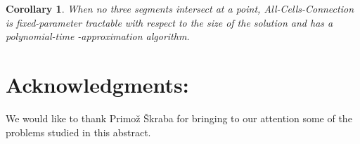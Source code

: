 \documentclass[11pt,a4paper]{article}
\newtheorem{corollary}[definition]{Corollary}
\begin{document}
\begin{corollary}
When no three segments intersect at a point, {\sc All-Cells-Connection} is fixed-parameter tractable with respect to the size of the solution and has a polynomial-time -approximation algorithm.
\end{corollary}



\section*{Acknowledgments:}
We would like to thank Primo{\v z} {\v S}kraba
 for bringing to our attention some of the problems studied in this abstract.



\end{document}
